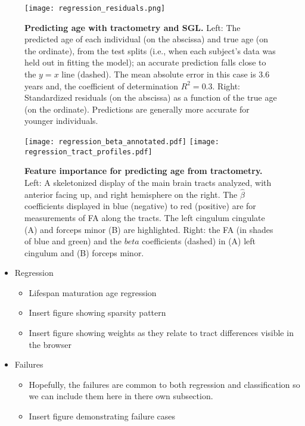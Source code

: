 \begin{figure}[!h]
    \centering
    \texttt{[image: regression\_residuals.png]}
    \caption{{\bf Predicting age with tractometry and SGL.} Left: The predicted age of each individual (on the abscissa) and true age (on the ordinate), from the test splits (i.e., when each subject's data was held out in fitting the model); an accurate prediction falls close to the $y=x$ line (dashed). The mean absolute error in this case is 3.6 years and, the coefficient of determination $R^2=0.3$. Right: Standardized residuals (on the abscissa) as a function of the true age (on the ordinate). Predictions are generally more accurate for younger individuals.
    }
    \label{fig:regress-results}
\end{figure}

\begin{figure}[!h]
    \centering
    \texttt{[image: regression\_beta\_annotated.pdf]}
    \texttt{[image: regression\_tract\_profiles.pdf]}
    \caption{{\bf Feature importance for predicting age from tractometry.} Left: A skeletonized display of the main brain tracts analyzed, with anterior facing up, and right hemisphere on the right. The $\hat{\beta}$ coefficients displayed in blue (negative) to red (positive) are for measurements of FA along the tracts. The left cingulum cingulate (A) and forceps minor (B) are highlighted. Right: the FA (in shades of blue and green) and the $beta$ coefficients (dashed) in (A) left cingulum and (B) forceps minor.
    }
    \label{fig:regress-beta}
\end{figure}


\begin{itemize}
  \item Regression
    \begin{itemize}
      \item Lifespan maturation age regression
      \item Insert figure showing sparsity pattern
      \item Insert figure showing weights as they relate to tract differences visible in the browser
    \end{itemize}
\end{itemize}
\begin{itemize}
  \item Failures
    \begin{itemize}
      \item Hopefully, the failures are common to both regression
        and classification so we can include them here in there own
        subsection.
      \item Insert figure demonstrating failure cases
    \end{itemize}
\end{itemize}


